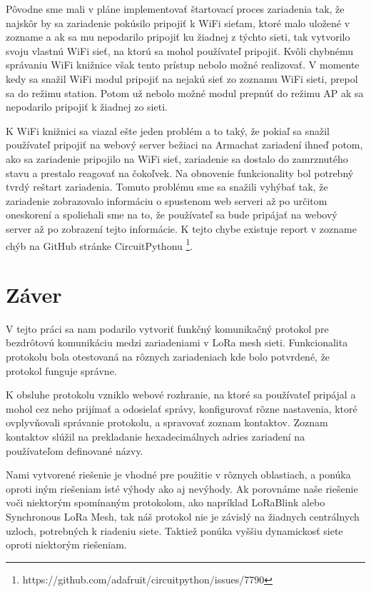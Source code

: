 \documentclass[slovak,master]{diploma}
\begin{document}
Pôvodne sme mali v pláne implementovať štartovací proces zariadenia tak, že najskôr by sa zariadenie pokúsilo pripojiť k WiFi sieťam, ktoré malo uložené v zozname a ak sa mu nepodarilo 
pripojiť ku žiadnej z týchto sieti, tak vytvorilo svoju vlastnú WiFi sieť, na ktorú sa mohol používateľ pripojiť. Kvôli chybnému správaniu WiFi knižnice však tento prístup nebolo možné 
realizovať. V momente kedy sa snažil WiFi modul pripojiť na nejakú sieť zo zoznamu WiFi sieti, prepol sa do režimu station. Potom už nebolo možné modul prepnúť do režimu AP ak sa nepodarilo pripojiť 
k žiadnej zo sieti.

K WiFi knižnici sa viazal ešte jeden problém a to taký, že pokiaľ sa snažil používateľ pripojiť na webový server bežiaci na Armachat zariadení ihneď potom, ako sa zariadenie pripojilo na WiFi sieť, 
zariadenie sa dostalo do zamrznutého stavu a prestalo reagovať na čokoľvek. Na obnovenie funkcionality bol potrebný tvrdý reštart zariadenia. 
Tomuto problému sme sa snažili vyhýbať tak, že zariadenie zobrazovalo informáciu o spustenom web serveri až po určitom oneskorení a spoliehali sme na to, že používateľ 
sa bude pripájať na webový server až po zobrazení tejto informácie. K tejto chybe existuje report v zozname chýb na GitHub stránke CircuitPythonu \footnote[5]{https://github.com/adafruit/circuitpython/issues/7790}.

\chapter{Záver}
V tejto práci sa nam podarilo vytvoriť funkčný komunikačný protokol pre bezdrôtovú komunikáciu medzi zariadeniami v LoRa mesh sieti.
Funkcionalita protokolu bola otestovaná na rôznych zariadeniach kde bolo potvrdené, že protokol funguje správne. 

K obsluhe protokolu vzniklo webové rozhranie, na ktoré sa používateľ pripájal a mohol cez neho prijímať a odosielať správy, konfigurovať 
rôzne nastavenia, ktoré ovplyvňovali správanie protokolu, a spravovať zoznam kontaktov. Zoznam kontaktov slúžil na prekladanie 
hexadecimálnych adries zariadení na používateľom definované názvy.

Nami vytvorené riešenie je vhodné pre použitie v rôznych oblastiach, a ponúka oproti iným riešeniam isté výhody ako aj nevýhody.
Ak porovnáme naše riešenie voči niektorým spomínaným protokolom, ako napríklad LoRaBlink alebo Synchronous LoRa Mesh, 
tak náš protokol nie je závislý na žiadnych centrálnych uzloch, potrebných k riadeniu siete. Taktiež ponúka vyššiu dynamickosť siete oproti 
niektorým riešeniam.
\end{document}
